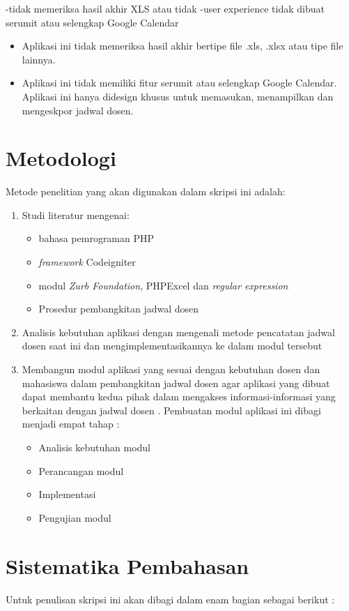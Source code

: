 -tidak memeriksa hasil akhir XLS atau tidak
-user experience tidak dibuat serumit atau selengkap Google Calendar
\begin{itemize}
	\item Aplikasi ini tidak memeriksa hasil akhir bertipe file .xls, .xlsx atau tipe file lainnya.
	\item Aplikasi ini tidak memiliki fitur serumit atau selengkap Google Calendar. Aplikasi ini hanya didesign khusus untuk memasukan, menampilkan dan mengeskpor jadwal dosen.
\end{itemize}

\section{Metodologi}
\label{sec:metlit}
Metode penelitian yang akan digunakan dalam skripsi ini adalah:
\begin{enumerate}
   \item Studi literatur mengenai:
   		\begin{itemize}
 		\item bahasa pemrograman PHP
 		\item \textit{framework} Codeigniter
 		\item modul \textit{Zurb Foundation}, PHPExcel dan \textit{regular expression}
 		\item Prosedur pembangkitan jadwal dosen
		\end{itemize}
   \item Analisis kebutuhan aplikasi dengan mengenali metode pencatatan jadwal dosen saat ini dan mengimplementasikannya ke dalam modul tersebut
    \item Membangun modul aplikasi yang sesuai dengan kebutuhan dosen dan mahasiswa dalam pembangkitan jadwal dosen agar aplikasi yang dibuat dapat membantu kedua pihak dalam mengakses informasi-informasi yang berkaitan dengan jadwal dosen . Pembuatan modul aplikasi ini dibagi menjadi empat tahap :
    	\begin{itemize}
 		\item Analisis kebutuhan modul 
 		\item Perancangan modul
 		\item Implementasi 
 		\item Pengujian modul
		\end{itemize}
\end{enumerate}
 

\section{Sistematika Pembahasan}
\label{sec:sispem}
Untuk penulisan skripsi ini akan dibagi dalam enam bagian sebagai berikut :

